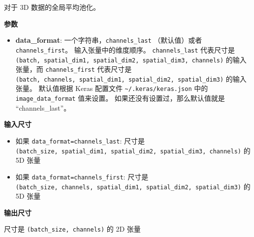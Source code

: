 对于 3D 数据的全局平均池化。

\textbf{参数}

\begin{itemize}
\tightlist
\item
  \textbf{data\_format}: 一个字符串，\texttt{channels\_last}
  （默认值）或者 \texttt{channels\_first}。 输入张量中的维度顺序。
  \texttt{channels\_last} 代表尺寸是
  \texttt{(batch,\ spatial\_dim1,\ spatial\_dim2,\ spatial\_dim3,\ channels)}
  的输入张量，而 \texttt{channels\_first} 代表尺寸是
  \texttt{(batch,\ channels,\ spatial\_dim1,\ spatial\_dim2,\ spatial\_dim3)}
  的输入张量。 默认值根据 Keras 配置文件
  \texttt{\textasciitilde{}/.keras/keras.json} 中的
  \texttt{image\_data\_format} 值来设置。
  如果还没有设置过，那么默认值就是 ``channels\_last''。
\end{itemize}

\textbf{输入尺寸}

\begin{itemize}
\tightlist
\item
  如果
  \texttt{data\_format=\textquotesingle{}channels\_last\textquotesingle{}}:
  尺寸是
  \texttt{(batch\_size,\ spatial\_dim1,\ spatial\_dim2,\ spatial\_dim3,\ channels)}
  的 5D 张量
\item
  如果
  \texttt{data\_format=\textquotesingle{}channels\_first\textquotesingle{}}:
  尺寸是
  \texttt{(batch\_size,\ channels,\ spatial\_dim1,\ spatial\_dim2,\ spatial\_dim3)}
  的 5D 张量
\end{itemize}

\textbf{输出尺寸}

尺寸是 \texttt{(batch\_size,\ channels)} 的 2D 张量

\newpage
